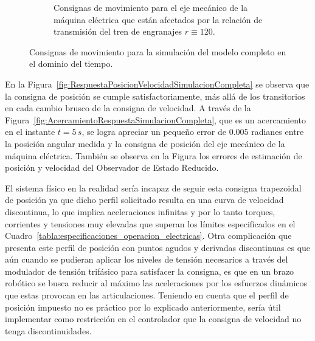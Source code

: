 \documentclass{article}
\begin{document}
\begin{figure}[H]
\begin{subfigure}[b]{0.48\textwidth}
        \caption{Consignas de movimiento para el eje mecánico de la máquina eléctrica que están afectados por la relación de transmisión del tren de engranajes \(r \equiv 120\).}
        \label{fig:ConsignasMovimientoMaquinaElectrica}
    \end{subfigure}
    \caption{Consignas de movimiento para la simulación del modelo completo en el dominio del tiempo.}
    \label{fig:ModeloCompletoConsignas}
\end{figure}

En la Figura~\ref{fig:RespuestaPosicionVelocidadSimulacionCompleta} se observa que la consigna de posición se cumple satisfactoriamente, más allá de los transitorios en cada cambio brusco de la consigna de velocidad. A través de la Figura~\ref{fig:AcercamientoRespuestaSimulacionCompleta}, que es un acercamiento en el instante \(t = 5\,s\), se logra apreciar un pequeño error de \(0{.}005\) radianes entre la posición angular medida y la consigna de posición del eje mecánico de la máquina eléctrica. También se observa en la Figura los errores de estimación de posición y velocidad del Observador de Estado Reducido.

El sistema físico en la realidad sería incapaz de seguir esta consigna trapezoidal de posición ya que dicho perfil solicitado resulta en una curva de velocidad discontinua, lo que implica aceleraciones infinitas y por lo tanto torques, corrientes y tensiones muy elevadas que superan los límites especificados en el Cuadro~\ref{tabla:especificaciones_operacion_electricas}. Otra complicación que presenta este perfil de posición con puntos agudos y derivadas discontinuas es que aún cuando se pudieran aplicar los niveles de tensión necesarios a través del modulador de tensión trifásico para satisfacer la consigna, es que en un brazo robótico se busca reducir al máximo las aceleraciones por los esfuerzos dinámicos que estas provocan en las articulaciones. Teniendo en cuenta que el perfil de posición impuesto no es práctico por lo explicado anteriormente, sería útil implementar como restricción en el controlador que la consigna de velocidad no tenga discontinuidades.
\end{document}
